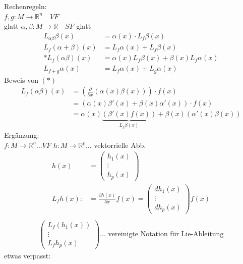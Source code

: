 \documentclass[ngerman]{tudscrreprt}
\begin{document}
Rechenregeln:\\  
$f, g : M \to \mathbb{R}^n \quad VF$\\ glatt
$\alpha, \beta: M\to \mathbb{R}\quad SF$ glatt
\begin{align*}
L_{\alpha \beta}\beta (x) &= \alpha(x)\cdot L_f\beta(x)\\ 
L_f(\alpha+\beta)(x)&=L_f \alpha(x) + L_f\beta(x)\\ 
* L_f(\alpha \beta)(x)&= \alpha(x) L_f\beta(x) + \beta(x) L_f\alpha(x)\\ 
L_{f+g}\alpha(x) &=L_f\alpha(x) + L_g\alpha(x)
\end{align*}
Beweis von $(*)$
\begin{align*}
L_f (\alpha \beta)(x) &= (\frac{\partial }{\partial x}(\alpha(x) \beta (x)) )\cdot f(x)\\ 
&=(\alpha(x)\beta'(x) + \beta(x)\alpha'(x) )\cdot f(x)\\ 
&=\alpha(x)\underbrace{ (\beta'(x) f(x)) }_{L_f\beta(x)} + \beta(x)(\alpha'(x)\beta(x))
\end{align*}
Ergänzung: \\ $f: M\to \mathbb{R}^n \dots VF$
$h: M\to \mathbb{R}^p \dots$ vektorrielle Abb.
\begin{align*}
h(x) &=
\begin{pmatrix}
h_1(x)\\ \vdots\\ h_p(x)
\end{pmatrix}\\
L_fh(x):&= \frac{\partial h(x)}{\partial x} f(x) = \begin{pmatrix} dh_1(x)\\\vdots\\ dh_p(x)  \end{pmatrix}f(x)\\ 
\end{align*}
\begin{align*}
\begin{pmatrix}
L_f(h_1(x))\\ \vdots\\ L_fh_p(x)
\end{pmatrix}\dots \text{ vereinigte Notation für Lie-Ableitung}
\end{align*}
etwas verpasst:
\end{document}
